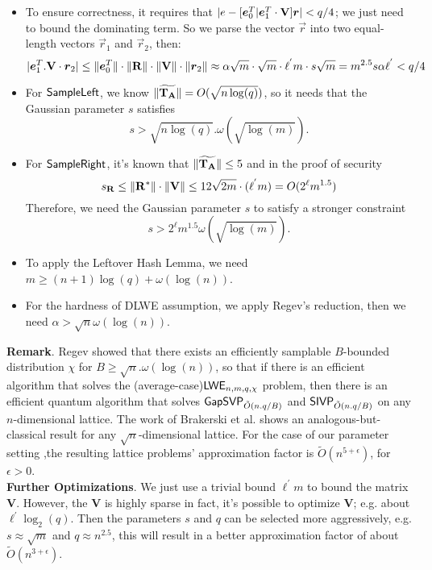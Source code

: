 \begin{itemize}
 \item To ensure correctness, it requires that $|e-[\boldsymbol{e}^{T}_{0}|\boldsymbol{e}^{T}_{1}\cdot \mathbf{V}]\boldsymbol{r}|< q/4$; we just need to bound the dominating term. So we parse the  vector $\vec{r}$ into two equal-length vectors $\vec{r}_{1}$ and $\vec{r}_{2}$, then:
 \begin{equation}
       |\boldsymbol{e}^{T}_{1}.\mathbf{V}\cdot \boldsymbol{r}_{2}|\leq \| \boldsymbol{e}^{T}_{0}\|\cdot \| \mathbf{R}\|
       \cdot \| \mathbf{V}\| \cdot \| \boldsymbol{r}_{2}\|\approx \alpha\sqrt{m}\cdot \sqrt{m}\cdot \ell^{'}m\cdot s\sqrt{m}=m^{2.5}s\alpha \ell^{'}< q/4
\end{equation}
 \item For $\mathsf{SampleLeft}$, we know $\| \widetilde{\mathbf{T}_{\mathbf{A}}}\|=O(\sqrt{n\log(q)})$, so it needs that the Gaussian parameter $s$ satisfies
 \begin{equation}
 s>\sqrt{n\log(q)}.\omega(\sqrt{\log(m)}).
 \end{equation}
 \item For $\mathsf{SampleRight}$, it's known that $\| \widetilde{\mathbf{T}_{\mathbf{A}}}\|\leq 5$ and in the proof of security
 \begin{equation}
 s_{\mathbf{R}}\leq \| \mathbf{R}^{*}\| \cdot \| \mathbf{V}\|\leq 12\sqrt{2m}\cdot (\ell^{'}m)=O(2^{\ell}m^{1.5})
 \end{equation}
 Therefore, we need the Gaussian parameter $s$ to satisfy a stronger constraint
 \begin{equation}
 s>2^{\ell}m^{1.5}\omega(\sqrt{\log(m)}).
 \end{equation}
 \item To apply the Leftover Hash Lemma, we need $m\geq (n+1)\log(q)+\omega(\log(n))$.\\
 \item For the hardness of DLWE assumption, we apply Regev's reduction, then we need $\alpha >\sqrt{n}\omega(\log(n))$.
\end{itemize}
\textbf{Remark}. Regev \cite{STOC:Regev05} showed that there exists an efficiently samplable $B$-bounded distribution $\chi$ for $B\geq \sqrt{n}.\omega(\log(n))$, so that if there is an efficient algorithm that solves the (average-case)$\mathsf{LWE}_{n,m,q,\chi}$ problem, then there is an efficient quantum algorithm that solves $\mathsf{GapSVP}_{\tilde{O}(n.q/B)}$ and $\mathsf{SIVP}_{\tilde{O}(n.q/B)}$ on any $n$-dimensional lattice. The work of Brakerski et al.\cite{STOC:BLPRS13} shows an analogous-but-classical result for any $\sqrt{n}$-dimensional lattice. For the case of our parameter setting ,the resulting lattice problems' approximation factor is $\widetilde{O}(n^{5+\epsilon})$, for $\epsilon>0$.\\[0.6cm]
\textbf{Further Optimizations}. We just use a trivial bound $\ell^{'}m$ to bound the matrix $\textbf{V}$. However, the $\textbf{V}$ is highly sparse in fact, it's possible to optimize $\textbf{V}$; e.g. about $\ell^{'}\log_{2}(q)$. Then the parameters $s$ and $q$ can be selected more aggressively, e.g. $s\approx \sqrt{m}$ and $q\approx n^{2.5}$, this will result in a better approximation factor of about $\widetilde{O}(n^{3+\epsilon})$.\

